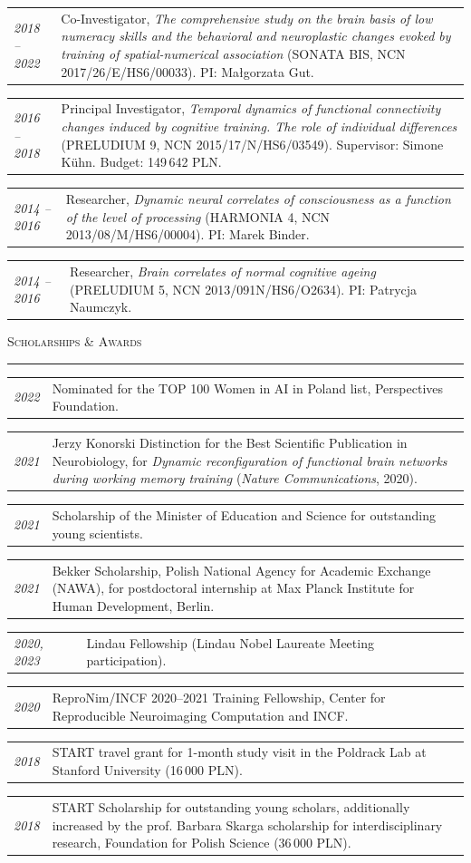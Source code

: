 \documentclass[10pt, a4paper]{article}
\makeatletter
\newcommand{\cvsection}[1]{%
  \vspace{1.4em}%
  {\large\scshape #1}%
  \vspace{0.25em}%
  \par\noindent\textcolor{rule}{\rule{\linewidth}{0.4pt}}%
  \vspace{0.5em}%
}
\newcommand{\cventry}[2]{%
  \begin{tabular*}{\linewidth}{@{}p{2.8cm}@{\hspace{0.5em}}p{\dimexpr\linewidth-3.3cm}@{}}
    \textcolor{accent}{\small\itshape #1} & #2 \\[0.2em]
  \end{tabular*}%
}
\makeatother
\begin{document}
\cventry{2018 -- 2022}{Co-Investigator, \textit{The comprehensive study on the brain basis of low numeracy skills and the behavioral and neuroplastic changes evoked by training of spatial-numerical association} (SONATA BIS, NCN 2017/26/E/HS6/00033). PI: Ma{\l}gorzata Gut.}

\cventry{2016 -- 2018}{Principal Investigator, \textit{Temporal dynamics of functional connectivity changes induced by cognitive training. The role of individual differences} (PRELUDIUM 9, NCN 2015/17/N/HS6/03549). Supervisor: Simone K\"uhn. Budget: 149\,642 PLN.}

\cventry{2014 -- 2016}{Researcher, \textit{Dynamic neural correlates of consciousness as a function of the level of processing} (HARMONIA 4, NCN 2013/08/M/HS6/00004). PI: Marek Binder.}

\cventry{2014 -- 2016}{Researcher, \textit{Brain correlates of normal cognitive ageing} (PRELUDIUM 5, NCN 2013/091N/HS6/O2634). PI: Patrycja Naumczyk.}

\cvsection{Scholarships \& Awards}

\cventry{2022}{Nominated for the TOP 100 Women in AI in Poland list, Perspectives Foundation.}

\cventry{2021}{Jerzy Konorski Distinction for the Best Scientific Publication in Neurobiology, for \textit{Dynamic reconfiguration of functional brain networks during working memory training} (\textit{Nature Communications}, 2020).}

\cventry{2021}{Scholarship of the Minister of Education and Science for outstanding young scientists.}

\cventry{2021}{Bekker Scholarship, Polish National Agency for Academic Exchange (NAWA), for postdoctoral internship at Max Planck Institute for Human Development, Berlin.}

\cventry{2020, 2023}{Lindau Fellowship (Lindau Nobel Laureate Meeting participation).}

\cventry{2020}{ReproNim/INCF 2020--2021 Training Fellowship, Center for Reproducible Neuroimaging Computation and INCF.}

\cventry{2018}{START travel grant for 1-month study visit in the Poldrack Lab at Stanford University (16\,000 PLN).}

\cventry{2018}{START Scholarship for outstanding young scholars, additionally increased by the prof. Barbara Skarga scholarship for interdisciplinary research, Foundation for Polish Science (36\,000 PLN).}
\end{document}
